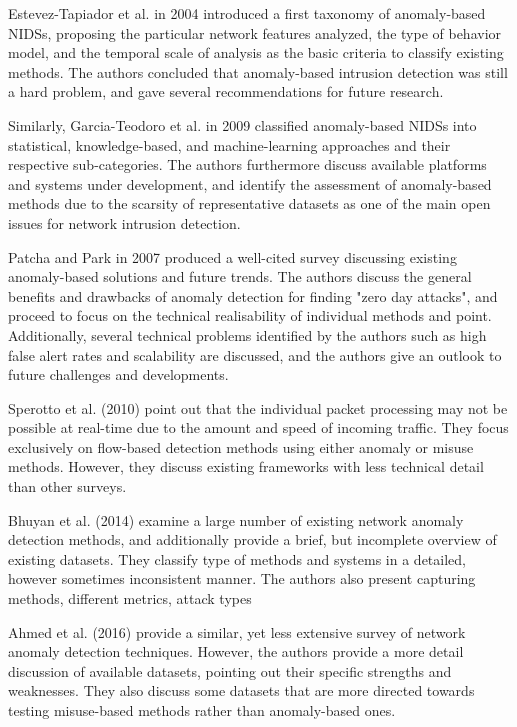 \documentclass[a4paper,12pt,twoside]{report}
\begin{document}
Estevez-Tapiador et al. \cite{garcia-teodoro_anomaly-based_2009} in 2004 introduced a first taxonomy of anomaly-based NIDSs, proposing the particular network features analyzed, the type of behavior model, and the temporal scale of analysis as the basic criteria to classify existing methods. The authors concluded that anomaly-based intrusion detection was still a hard problem, and gave several recommendations for future research. 

Similarly, Garcia-Teodoro et al. \cite{estevez-tapiador_anomaly_2004} in 2009 classified anomaly-based NIDSs into statistical, knowledge-based, and machine-learning approaches and their respective sub-categories. The authors furthermore discuss available platforms and systems under development, and identify the assessment of anomaly-based methods due to the scarsity of representative datasets as one of the main open issues for network intrusion detection.

Patcha and Park \cite{patcha_overview_2007} in 2007 produced a well-cited survey discussing existing anomaly-based solutions and future trends. The authors discuss the general benefits and drawbacks of anomaly detection for finding "zero day attacks", and proceed to focus on the technical realisability of individual methods and point. Additionally, several technical problems identified by the authors such as high false alert rates and scalability are discussed, and the authors give an outlook to future challenges and developments.

Sperotto et al. \cite{sperotto_overview_2010}(2010) point out that the individual packet processing may not be possible at real-time due to the amount and speed of incoming traffic. They focus exclusively on flow-based detection methods using either anomaly or misuse methods. However, they discuss existing frameworks with less technical detail than other surveys. 

Bhuyan et al. \cite{bhuyan_network_2014} (2014) examine a large number of existing network anomaly detection methods, and additionally provide a brief, but incomplete overview of existing datasets. They classify type of methods and systems in a detailed, however sometimes inconsistent manner. The authors also present capturing methods,  different 
metrics, attack types

Ahmed et al. \cite{ahmed2016survey} (2016) provide a similar, yet less extensive survey of network anomaly detection techniques. However, the authors provide a more detail discussion of available datasets, pointing out their specific strengths and weaknesses. They also discuss some datasets that are more directed towards testing misuse-based methods rather than anomaly-based ones. 
\end{document}
